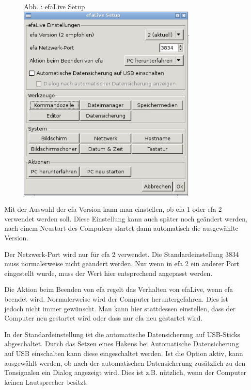 \documentclass[a4paper,12pt,twoside]{article}
\newcounter{Abb}
\renewcommand\theAbb{\arabic{Abb}}
\begin{document}
\bigskip



\begin{figure}
\centering
\begin{minipage}{9.006cm}
Abb. \stepcounter{Abb}{\theAbb}: efaLive Setup
\includegraphics[width=9.006cm,height=10.028cm]{efaLivede-img/efaLivede-img19.png}\end{minipage}
\end{figure}
Mit der Auswahl der efa Version kann man einstellen, ob efa 1 oder efa 2
verwendet werden soll. Diese Einstellung kann auch später noch geändert
werden, nach einem Neustart des Computers startet dann automatisch die
ausgewählte Version.

Der Netzwerk-Port wird nur für efa 2 verwendet. Die Standardeinstellung
3834 muss normalerweise nicht geändert werden. Nur wenn in efa 2 ein
anderer Port eingestellt wurde, muss der Wert hier entsprechend
angepasst werden.


\bigskip

Die {\textquotedbl}Aktion beim Beenden von efa{\textquotedbl} regelt das
Verhalten von efaLive, wenn efa beendet wird. Normalerweise wird der
Computer heruntergefahren. Dies ist jedoch nicht immer gewünscht. Man
kann hier stattdessen einstellen, dass der Computer neu gestartet wird
oder dass nur efa neu gestartet wird.


\bigskip

In der Standardeinstellung ist die automatische Datensicherung auf
USB-Sticks abgeschaltet. Durch das Setzen eines Hakens bei
{\textquotedbl}Automatische Datensicherung auf USB
einschalten{\textquotedbl} kann diese eingeschaltet werden. Ist die
Option aktiv, kann ausgewählt werden, ob nach der automatischen
Datensicherung zusätzlich zu den Tonsignalen ein Dialog angezeigt wird.
Dies ist z.B. nützlich, wenn der Computer keinen Lautsprecher besitzt.
\end{document}
